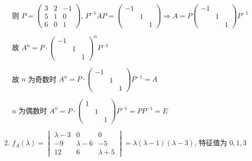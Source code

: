 \begin{enumerate}
                   则 \( P = \begin{pmatrix}
                       3 & 2 & -1 \\
                       5 & 1 & 0  \\
                       6 & 0 & 1
                   \end{pmatrix} \), \( P^{-1}AP = \begin{pmatrix}
                       -1 &   &   \\
                          & 1 &   \\
                          &   & 1
                   \end{pmatrix} \Rightarrow A = P\begin{pmatrix}
                       -1 &   &   \\
                          & 1 &   \\
                          &   & 1
                   \end{pmatrix}P^{-1} \)

                   故 \( A^{n} = P\cdot\begin{pmatrix}
                       -1 &   &   \\
                          & 1 &   \\
                          &   & 1
                   \end{pmatrix}^{n}P^{-1} \)

                   故 \( n \) 为奇数时 \( A^{n} = P\cdot\begin{pmatrix}
                       -1 &   &   \\
                          & 1 &   \\
                          &   & 1
                   \end{pmatrix}P^{-1} = A \)

                   \( n \) 为偶数时 \( A^{n} = P\cdot\begin{pmatrix}
                       1 &   &   \\
                         & 1 &   \\
                         &   & 1
                   \end{pmatrix}P^{-1} = PP^{-1} = E \)
             \item %
                   \( f_{A}(\lambda) = \begin{vmatrix}
                       \lambda - 3 & 0           & 0           \\
                       -9          & \lambda - 6 & -5          \\
                       12          & 6           & \lambda + 5
                   \end{vmatrix} = \lambda(\lambda - 1)(\lambda - 3) \), 特征值为 \( 0, 1, 3 \)


\end{enumerate}
